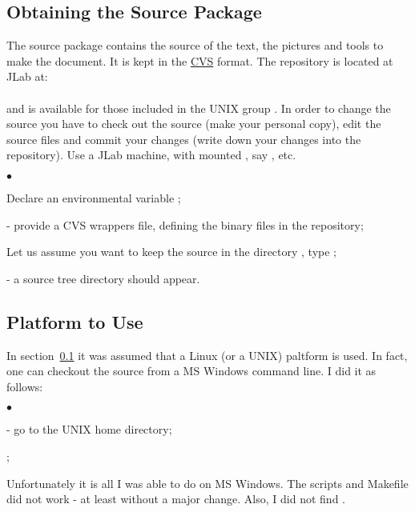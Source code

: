\documentclass[12pt,letterpaper]{article}
\begin{document}
\subsection{Obtaining the Source Package}
\label{sec:obtain}

 The source package contains the source of the text, 
 the pictures and tools to make the document.
 It is kept in the \href{http://www.cvshome.org/}{CVS} format.
 The repository is located at JLab at: \\
  \\
 and is available for those included in the UNIX group .
 In order to change the source you have to check out the source
 (make your personal copy), edit the source files and commit
 your changes (write down your changes into the repository). Use
 a JLab machine, with mounted , say ,  etc.
  \begin{list}{$\bullet$}{\setlength{\itemsep}{-0.15cm}}
    \item Declare an environmental variable ;
    \item {} - provide a CVS wrappers file,
           defining the binary files in the repository;
    \item Let us assume you want to keep the source in the directory ,
          type ;
    \item {} - a source tree directory 
          should appear. 
  \end{list}
 
   
\subsection{Platform to Use}
\label{sec:platform}   

  In section~\ref{sec:obtain} it was assumed that a Linux (or a UNIX) paltform
  is used. In fact, one can checkout the source from a MS Windows command line.
  I did it as follows:
  \begin{list}{$\bullet$}{\setlength{\itemsep}{-0.15cm}}
    \item {} - go to the UNIX home directory;
    \item {};
  \end{list}
  Unfortunately it is all I was able to do on MS Windows.
  The scripts and Makefile did not work - at least without
  a major change. Also, I did not find .
\end{document}
